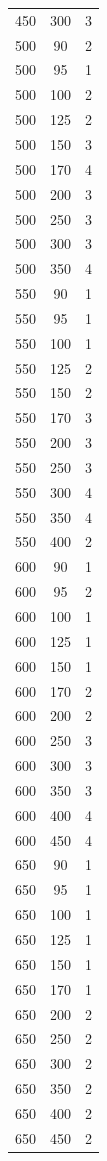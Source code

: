 \begin{longtable}{c c c}
450 & 300 & 3 \\
500 & 90 & 2 \\
500 & 95 & 1 \\
500 & 100 & 2 \\
500 & 125 & 2 \\
500 & 150 & 3 \\
500 & 170 & 4 \\
500 & 200 & 3 \\
500 & 250 & 3 \\
500 & 300 & 3 \\
500 & 350 & 4 \\
550 & 90 & 1 \\
550 & 95 & 1 \\
550 & 100 & 1 \\
550 & 125 & 2 \\
550 & 150 & 2 \\
550 & 170 & 3 \\
550 & 200 & 3 \\
550 & 250 & 3 \\
550 & 300 & 4 \\
550 & 350 & 4 \\
550 & 400 & 2 \\
600 & 90 & 1 \\
600 & 95 & 2 \\
600 & 100 & 1 \\
600 & 125 & 1 \\
600 & 150 & 1 \\
600 & 170 & 2 \\
600 & 200 & 2 \\
600 & 250 & 3 \\
600 & 300 & 3 \\
600 & 350 & 3 \\
600 & 400 & 4 \\
600 & 450 & 4 \\
650 & 90 & 1 \\
650 & 95 & 1 \\
650 & 100 & 1 \\
650 & 125 & 1 \\
650 & 150 & 1 \\
650 & 170 & 1 \\
650 & 200 & 2 \\
650 & 250 & 2 \\
650 & 300 & 2 \\
650 & 350 & 2 \\
650 & 400 & 2 \\
650 & 450 & 2 \\

\end{longtable}
